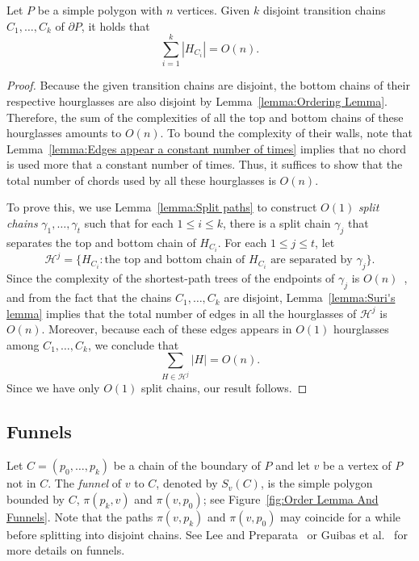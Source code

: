 \documentclass[a4paper,UKenglish]{lipics}
\newcommand{\fn}[2]{\ensuremath{S_{\scriptscriptstyle #1}(#2)}}
\newcommand{\p}[2]{\ensuremath{\pi(#1, #2)}}
\begin{document}
\begin{lemma}\label{lemma:Bounding complexity of hourglasses}
Let $P$ be a simple polygon with $n$ vertices.
Given $k$ disjoint transition chains $C_1, \ldots, C_k$  of $\partial P$, it holds that  $$\sum_{i=1}^k |H_{C_i}| = O(n).$$
\end{lemma}
\begin{proof}

Because the given transition chains are disjoint, the bottom chains of their respective hourglasses are also disjoint by Lemma~\ref{lemma:Ordering Lemma}. Therefore, the sum of the complexities of all the top and bottom chains of these hourglasses amounts to $O(n)$. 
To bound the complexity of their walls, note that
Lemma~\ref{lemma:Edges appear a constant number of times} implies that no chord is used more that a constant number of times. Thus, it suffices to show that the total number of chords used by all these hourglasses is $O(n)$.

To prove this, we use Lemma~\ref{lemma:Split paths} to construct $O(1)$ \emph{split chains} $\gamma_1, \ldots, \gamma_t$ such that for each $1\leq i\leq k$, there is a split chain $\gamma_j$ that separates the top and bottom chain of $H_{C_i}$.
For each $1\leq j\leq t$, let $$\mathcal H^j = \{H_{C_i} : \text{the top and bottom chain of $H_{C_i}$ are separated by }\gamma_j\}.$$
Since the complexity of the shortest-path trees of the endpoints of $\gamma_j$ is $O(n)$~\cite{guibasShortestPathTree},
and from the fact that the chains $C_1, \ldots, C_k$ are disjoint,  Lemma~\ref{lemma:Suri's lemma} implies that
the total number of edges in all the hourglasses of $\mathcal H^j$ is $O(n)$. Moreover, because each of these edges appears in $O(1)$ hourglasses among $C_1, \ldots, C_k$, we conclude that 
$$\sum_{H \in \mathcal H^j } |H| = O(n).$$
Since we have only $O(1)$ split chains, our result follows.
\end{proof}

\subsection{Funnels}

Let $C = (p_0, \ldots, p_k)$ be a chain of the boundary of $P$ and let $v$ be a vertex of $P$ not in $C$.
The \emph{funnel} of $v$ to $C$, denoted by $\fn{v}{C}$, is the simple polygon bounded by $C$, $\p{p_k}{v}$ and $\p{v}{p_0}$; see Figure~\ref{fig:Order Lemma And Funnels}. 
Note that the paths $\p{v}{p_k}$ and $\p{v}{p_0}$ may coincide for a while before splitting into disjoint chains. 
See Lee and Preparata~\cite{lee1984euclidean} or Guibas et al.~\cite{guibasShortestPathTree} for more details on funnels.
\end{document}
